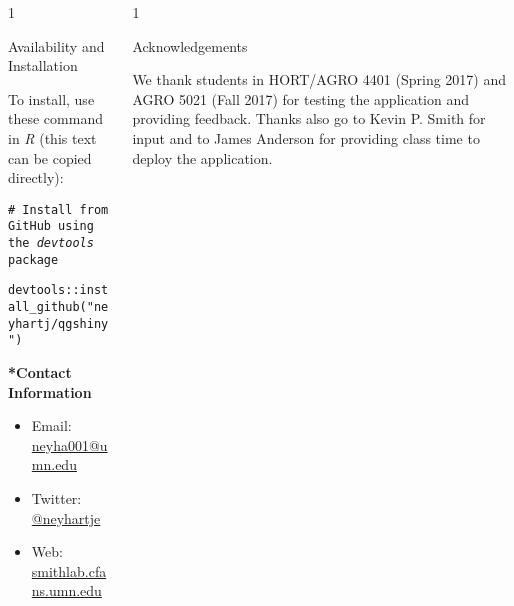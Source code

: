 \documentclass[final]{beamer}
\newlength{\onecolwid}
\newlength{\twocolwid}
\begin{document}
\begin{frame}[t]
\begin{columns}[t]
\begin{column}{\twocolwid}
\begin{columns}[t,totalwidth=\twocolwid]
\begin{column}{1\onecolwid}
\begin{alertblock}{Availability and Installation}
\begin{footnotesize}
To install, use these command in \textit{R} (this text can be copied directly):


\texttt{\# Install from GitHub using the \textit{devtools} package}  %

\texttt{devtools::install\_github("neyhartj/qgshiny")}  %

\vspace{1cm}


\textbf{*Contact Information}

\begin{itemize}
\item Email: \href{mailto:neyha001@umn.edu}{neyha001@umn.edu}
\item Twitter: \href{https://twitter.com/neyhartje}{@neyhartje}
\item Web: \href{http://smithlab.cfans.umn.edu/}{smithlab.cfans.umn.edu}
\end{itemize}


\end{footnotesize}


\end{alertblock}


\end{column}




\begin{column}{1\onecolwid} %



\begin{block}{\large{Acknowledgements}}

\begin{footnotesize}

We thank students in HORT/AGRO 4401 (Spring 2017) and AGRO 5021 (Fall 2017) for testing the application and providing feedback. Thanks also go to Kevin P. Smith for input and to James Anderson for providing class time to deploy the application.

\end{footnotesize}

\end{block}



\end{column}
\end{columns}
\end{column}
\end{columns}
\end{frame}
\end{document}
